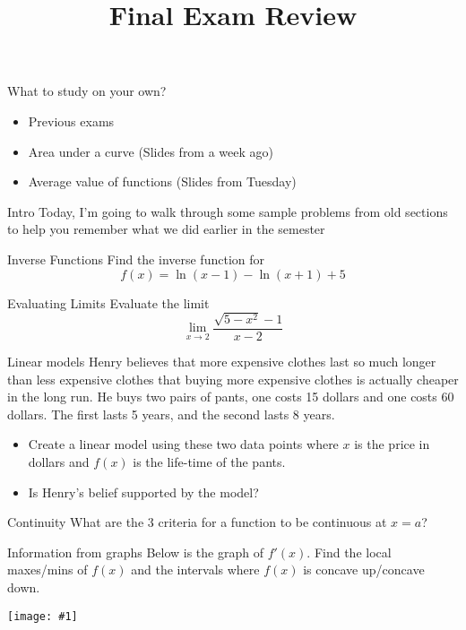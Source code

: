 \documentclass[t]{beamer}
\title{Final Exam Review}
\date{}
\newcommand{\img}[1]{
\vfill
\begin{center}
\texttt{[image: \#1]}
\end{center}
\vfill
}
\begin{document}
\frame{\titlepage}

\begin{frame}{What to study on your own?}
\begin{itemize}
\item Previous exams
\item Area under a curve  (Slides from a week ago)
\item Average value of functions (Slides from Tuesday)
\end{itemize}
\end{frame}

\begin{frame}{Intro}
Today, I'm going to walk through some sample problems from 
old sections to help you remember what we did earlier in the semester
\end{frame}

\begin{frame}{Inverse Functions}
Find the inverse function for
$$f(x) = \ln(x - 1) - \ln(x+ 1) + 5$$
\end{frame}

\begin{frame}{Evaluating Limits}
Evaluate the limit
$$\lim_{x \to 2} \frac{\sqrt{5 - x^2} -1}{x - 2}$$
\end{frame}

\begin{frame}{Linear models}
Henry believes that more expensive clothes last so much 
longer than less expensive clothes that buying more expensive
clothes is actually cheaper in the long run.  He
buys two pairs of pants, one costs 15 dollars and one costs
60 dollars.  The first lasts 5 years, and the second lasts
8 years.  

\begin{itemize}
\item Create a linear model using these two data points
where $x$ is the price in dollars and $f(x)$ is the life-time
of the pants.

\item Is Henry's belief supported by the model?  
\end{itemize}
\end{frame}

\begin{frame}{Continuity}
What are the 3 criteria for a function to be
continuous at $x = a$?
\end{frame}

\begin{frame}{Information from graphs}
Below is the graph of $f'(x)$. Find the local maxes/mins
of $f(x)$ and the intervals where $f(x)$ is concave up/concave 
down.

\img{fr1}
\end{frame}
\end{document}
